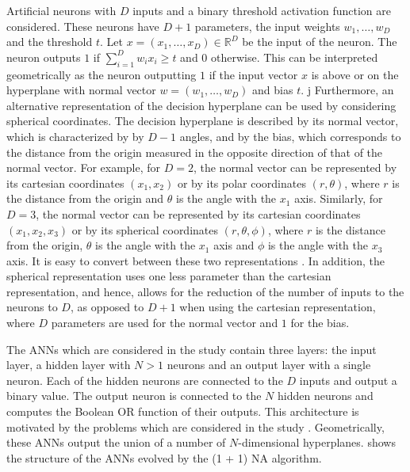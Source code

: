 Artificial neurons with $D$ inputs and a binary threshold activation function are considered.
These neurons have $D + 1$ parameters, the input weights $w_1, \ldots, w_D$ and the threshold $t$.
Let $x = (x_1, \ldots, x_D) \in \mathds{R}^D$ be the input of the neuron. The neuron outputs $1$ if $\sum_{i=1}^D w_i x_i \geq t$ and $0$
otherwise.
This can be interpreted geometrically as the neuron outputting $1$ if the input vector $x$ is above or on the hyperplane with normal vector
$w = (w_1, \ldots, w_D)$ and bias $t$.
j
Furthermore, an alternative representation of the decision hyperplane can be used by considering spherical coordinates.
The decision hyperplane is described by its normal vector, which is characterized by by $D - 1$ angles, and by the bias, which corresponds to the distance from the origin
measured in the opposite direction of that of the normal vector.
For example, for $D = 2$, the normal vector can be represented by its cartesian coordinates $(x_1, x_2)$ or by its polar coordinates
$(r, \theta)$, where $r$ is the distance from the origin and $\theta$ is the angle with the $x_1$ axis. Similarly, for $D = 3$, the normal vector can
be represented by its cartesian coordinates $(x_1, x_2, x_3)$ or by its spherical coordinates $(r, \theta, \phi)$, where $r$ is the distance from the
origin, $\theta$ is the angle with the $x_1$ axis and $\phi$ is the angle with the $x_3$ axis.
It is easy to convert between these two representations \cite{spherical}. In addition, the spherical representation uses one less parameter than the cartesian
representation, and hence, allows for the reduction of the number of inputs to the neurons to $D$, as opposed to $D + 1$ when using the cartesian representation,
where $D$ parameters are used for the normal vector and $1$ for the bias.


The ANNs which are considered in the study contain three layers: the input layer, a hidden layer with $N > 1$ neurons and an output layer with a single neuron.
Each of the hidden neurons are connected to the $D$ inputs and output a binary value. The output neuron is connected to the $N$ hidden neurons and
computes the Boolean OR function of their outputs.
This architecture is motivated by the problems which are considered in the study \cite{na}.
Geometrically, these ANNs output the union of a number of $N$-dimensional hyperplanes.
 shows the structure of the ANNs evolved by the (1 + 1) NA algorithm.

